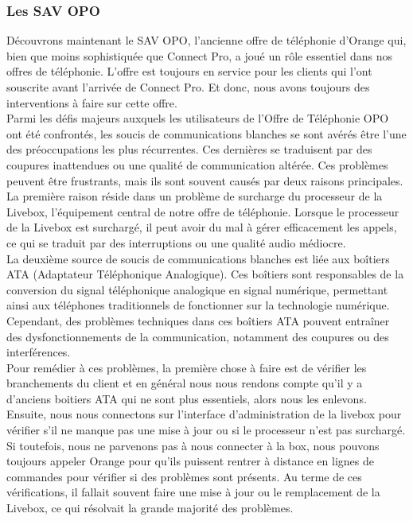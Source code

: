 \documentclass[12pt, a4paper]{article}
\begin{document}
\newpage
\subsubsection{Les SAV OPO}
Découvrons maintenant le SAV OPO, l'ancienne offre de
téléphonie d'Orange qui, bien que moins sophistiquée
que Connect Pro, a joué un rôle essentiel dans nos offres
de téléphonie. L'offre est toujours en service pour les clients
qui l'ont souscrite avant l'arrivée de Connect Pro. Et donc, 
nous avons toujours des interventions à faire sur cette offre.\\

Parmi les défis majeurs auxquels les utilisateurs de l'Offre de
Téléphonie OPO ont été confrontés, les soucis de communications
blanches se sont avérés être l'une des préoccupations les plus
récurrentes. Ces dernières se traduisent par des 
coupures inattendues ou une qualité de communication
altérée. Ces problèmes peuvent être frustrants, mais ils sont
souvent causés par deux raisons principales.\\

La première raison réside dans un problème de surcharge du
processeur de la Livebox, l'équipement central de notre offre
de téléphonie. Lorsque le processeur de la Livebox est surchargé,
il peut avoir du mal à gérer efficacement les appels, ce qui se
traduit par des interruptions ou une qualité audio médiocre.\\

La deuxième source de soucis de communications blanches est
liée aux boîtiers ATA (Adaptateur Téléphonique Analogique).
Ces boîtiers sont responsables de la conversion du signal
téléphonique analogique en signal numérique, permettant ainsi
aux téléphones traditionnels de fonctionner sur la technologie
numérique. Cependant, des problèmes techniques dans ces boîtiers
ATA pouvent entraîner des dysfonctionnements de la communication,
notamment des coupures ou des interférences.\\

Pour remédier à ces problèmes, la première chose à faire est 
de vérifier les branchements du client et 
en général nous nous rendons compte qu'il y a d'anciens 
boitiers ATA qui ne sont plus essentiels, alors nous 
les enlevons. Ensuite, nous
nous connectons sur l'interface d'administration de la livebox 
pour vérifier s'il ne manque pas une mise à jour ou si le 
processeur n'est pas surchargé. Si toutefois, nous 
ne parvenons pas à nous connecter à la box, nous pouvons 
toujours appeler Orange pour qu'ils puissent rentrer 
à distance en lignes de commandes pour 
vérifier si des problèmes sont présents.
Au terme de ces vérifications, il fallait souvent 
faire une mise à jour ou le remplacement de la Livebox, 
ce qui résolvait la grande majorité des problèmes.\\
\end{document}
